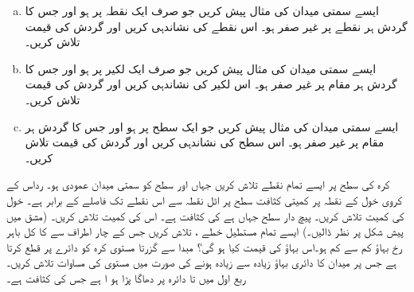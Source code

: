 
\begin{enumerate}[a.]
\item
ایسے سمتی میدان  کی مثال پیش کریں  جو صرف ایک نقطہ پر  ہو اور جس کا گردش  ہر نقطے   پر غیر صفر ہو۔ اس نقطے کی نشاندہی کریں اور گردش کی قیمت تلاش کریں۔
\item
ایسے سمتی میدان  کی مثال پیش کریں  جو صرف ایک  لکیر  پر  ہو اور جس کا گردش  ہر  مقام    پر غیر صفر ہو۔ اس لکیر  کی نشاندہی کریں اور گردش کی قیمت تلاش کریں۔
\item
ایسے سمتی میدان  کی مثال پیش کریں  جو ایک    سطح  پر  ہو اور جس کا گردش  ہر  مقام پر غیر صفر ہو۔ اس سطح کی نشاندہی کریں اور گردش کی قیمت تلاش کریں۔
\end{enumerate}
کرہ  کی سطح پر ایسے تمام نقطے  تلاش کریں جہاں   اور سطح کو  سمتی میدان    عمودی ہو۔
رداس  کے  کروی خول  کے نقطہ  پر کمیتی  کثافت     سطح پر اٹل نقطہ  سے اس نقطے تک  فاصلے کے برابر ہے۔ خول کی کمیت تلاش کریں۔
پیچ دار سطح  جہاں  ہے کی کثافت  ہے۔ اس کی کمیت تلاش کریں۔ (مشق   میں پیش شکل پر نظر ڈالیں۔)
ایسے تمام مستطیل خطے  ،  تلاش کریں جس کے چار اطراف سے
  کا کل باہر رخ بہاؤ  کم سے کم ہو۔اس بہاؤ کی قیمت کیا ہو گی؟
مبدا سے گزرتا     مستوی کرہ  کو  دائرے پر  قطع کرتا ہے جس  پر میدان      کا  دائری بہاؤ زیادہ سے زیادہ ہونے کی صورت میں مستوی کی مساوات تلاش کریں۔
ربع اول میں  تا  دائرہ  پر  دھاگا پڑا ہو ا ہے جس کی کثافت  ہے۔
